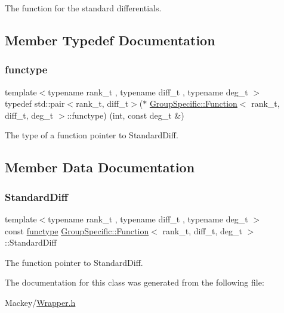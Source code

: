 The function for the standard differentials. 

\subsection{Member Typedef Documentation}
\mbox{\label{classGroupSpecific_1_1Function_a16b2712611a10d8cc8034b9bdf89af06}} 
\subsubsection{\texorpdfstring{functype}{functype}}
{\footnotesize\ttfamily template$<$typename rank\+\_\+t , typename diff\+\_\+t , typename deg\+\_\+t $>$ \\
typedef std\+::pair$<$rank\+\_\+t, diff\+\_\+t$>$($\ast$ \hyperlink{classGroupSpecific_1_1Function}{Group\+Specific\+::\+Function}$<$ rank\+\_\+t, diff\+\_\+t, deg\+\_\+t $>$\+::functype) (int, const deg\+\_\+t \&)}



The type of a function pointer to Standard\+Diff. 



\subsection{Member Data Documentation}
\mbox{\label{classGroupSpecific_1_1Function_a8ead55e2f2e2bbda4deea3964793498d}} 
\subsubsection{\texorpdfstring{Standard\+Diff}{StandardDiff}}
{\footnotesize\ttfamily template$<$typename rank\+\_\+t , typename diff\+\_\+t , typename deg\+\_\+t $>$ \\
const \hyperlink{classGroupSpecific_1_1Function_a16b2712611a10d8cc8034b9bdf89af06}{functype} \hyperlink{classGroupSpecific_1_1Function}{Group\+Specific\+::\+Function}$<$ rank\+\_\+t, diff\+\_\+t, deg\+\_\+t $>$\+::Standard\+Diff\hspace{0.3cm}{\ttfamily [static]}}



The function pointer to Standard\+Diff. 



The documentation for this class was generated from the following file\+:\begin{DoxyCompactItemize}
\item 
Mackey/\hyperlink{Wrapper_8h}{Wrapper.\+h}\end{DoxyCompactItemize}
